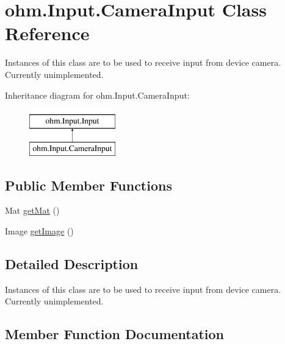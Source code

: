 \hypertarget{classohm_1_1_input_1_1_camera_input}{}\section{ohm.\+Input.\+Camera\+Input Class Reference}
\label{classohm_1_1_input_1_1_camera_input}


Instances of this class are to be used to receive input from device camera. Currently unimplemented.  


Inheritance diagram for ohm.\+Input.\+Camera\+Input\+:\begin{figure}[H]
\begin{center}
\leavevmode
\includegraphics[height=2.000000cm]{classohm_1_1_input_1_1_camera_input}
\end{center}
\end{figure}
\subsection*{Public Member Functions}
\begin{DoxyCompactItemize}
\item 
Mat \hyperlink{classohm_1_1_input_1_1_camera_input_a9717b65589c2edfeac13f0c4a3e85b4d}{get\+Mat} ()
\item 
Image \hyperlink{classohm_1_1_input_1_1_camera_input_a5cd3267a481374402aeb15ddc48d8836}{get\+Image} ()
\end{DoxyCompactItemize}


\subsection{Detailed Description}
Instances of this class are to be used to receive input from device camera. Currently unimplemented. 

\subsection{Member Function Documentation}
\hypertarget{classohm_1_1_input_1_1_camera_input_a5cd3267a481374402aeb15ddc48d8836}{}\label{classohm_1_1_input_1_1_camera_input_a5cd3267a481374402aeb15ddc48d8836} 
